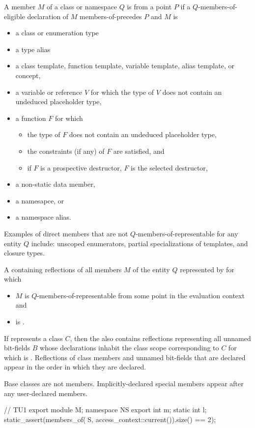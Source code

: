 \begin{itemdescr}
\pnum
A member $M$ of a class or namespace $Q$ is
 from a point $P$
if a $Q$-members-of-eligible declaration of $M$ members-of-precedes $P$
and $M$ is
\begin{itemize}
\item
  a class or enumeration type
\item
  a type alias
\item
  a class template, function template,
  variable template, alias template, or concept,
\item
  a variable or reference $V$
  for which the type of $V$ does not contain an undeduced placeholder type,
\item
  a function $F$ for which
  \begin{itemize}
  \item
    the type of $F$  does not contain an undeduced placeholder type,
  \item
    the constraints (if any) of $F$ are satisfied, and
  \item
    if $F$ is a prospective destructor,
    $F$ is the selected destructor,
  \end{itemize}
\item
  a non-static data member,
\item
  a namesapce, or
\item
  a namespace alias.
\end{itemize}
\begin{note}
Examples of direct members that are not $Q$-members-of-representable
for any entity $Q$ include:
unscoped enumerators,
partial specializations of templates, and
closure types.
\end{note}

\pnum
\returns
A  containing reflections of all members $M$
of the entity $Q$ represented by  for which
\begin{itemize}
\item
  $M$ is $Q$-members-of-representable
  from some point in the evaluation context and
\item
   is .
\end{itemize}
If  represents a class $C$,
then the  also contains reflections
representing all unnamed bit-fields $B$
whose declarations inhabit the class scope corresponding to $C$
for which  is .
Reflections of class members and unnamed bit-fields that are declared
appear in the order in which they are declared.
\begin{note}
Base classes are not members.
Implicitly-declared special members
appear after any user-declared members.
\end{note}
\begin{example}
\begin{codeblock}
// TU1
export module M;
namespace NS {
  export int m;
  static int l;
}
static_assert(members_of(^^NS, access_context::current()).size() == 2);


\end{codeblock}
\end{example}
\end{itemdescr}
